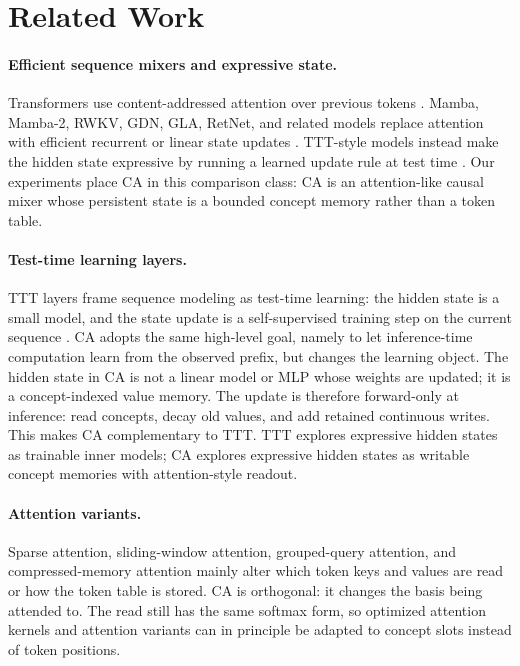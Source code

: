 \section{Related Work}
\label{sec:main-related}

\paragraph{Efficient sequence mixers and expressive state.}
Transformers use content-addressed attention over previous tokens \citep{vaswani2017attention}. Mamba, Mamba-2, RWKV, GDN, GLA, RetNet, and related models replace attention with efficient recurrent or linear state updates \citep{gu2023mamba,dao2024transformers,peng2023rwkv,yang2025gated,yang2024gated,sun2023retentive}. TTT-style models instead make the hidden state expressive by running a learned update rule at test time \citep{sun2025learning}. Our experiments place CA in this comparison class: CA is an attention-like causal mixer whose persistent state is a bounded concept memory rather than a token table.

\paragraph{Test-time learning layers.}
TTT layers frame sequence modeling as test-time learning: the hidden state is a small model, and the state update is a self-supervised training step on the current sequence \citep{sun2020test,sun2025learning}. CA adopts the same high-level goal, namely to let inference-time computation learn from the observed prefix, but changes the learning object. The hidden state in CA is not a linear model or MLP whose weights are updated; it is a concept-indexed value memory. The update is therefore forward-only at inference: read concepts, decay old values, and add retained continuous writes. This makes CA complementary to TTT. TTT explores expressive hidden states as trainable inner models; CA explores expressive hidden states as writable concept memories with attention-style readout.

\paragraph{Attention variants.}
Sparse attention, sliding-window attention, grouped-query attention, and compressed-memory attention mainly alter which token keys and values are read or how the token table is stored. CA is orthogonal: it changes the basis being attended to. The read still has the same softmax form, so optimized attention kernels and attention variants can in principle be adapted to concept slots instead of token positions.

